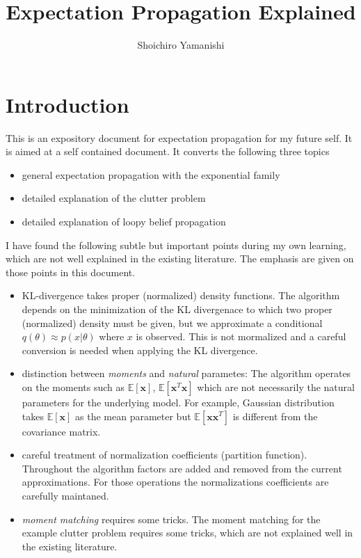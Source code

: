 \documentclass[a4]{article}
\title{Expectation Propagation Explained}
\author{Shoichiro Yamanishi}
\begin{document}
\maketitle

\section{Introduction}
This is an expository document for expectation propagation for my future self.
It is aimed at a self contained document.
It converts the following three topics
\begin{itemize}
\item general expectation propagation with the exponential family
\item detailed explanation of the clutter problem
\item detailed explanation of loopy belief propagation
\end{itemize}

I have found the following subtle but important points during my own learning, which are not well explained
in the existing literature. The emphasis are given on those points in this document.

\begin{itemize}
\item KL-divergence takes proper (normalized) density functions.
The algorithm depends on the minimization of the KL divergenace to which two proper (normalized) density
must be given, but we approximate a conditional $q(\theta) \approx p(x|\theta)$ where $x$ is observed.
This is not mormalized and a careful conversion is needed when applying the KL divergence.

\item distinction between \emph{moments} and \emph{natural} parametes: The algorithm operates on
the moments such as $\mathbb{E}[\bm{x}]$, $\mathbb{E}[\bm{x}^T\bm{x}]$ which are not necessarily the
natural parameters for the underlying model. For example, Gaussian distribution takes
$\mathbb{E}[\bm{x}]$ as the mean parameter but $\mathbb{E}[\bm{x}\bm{x}^T]$ is different from the covariance matrix.

\item careful treatment of normalization coefficients (partition function). Throughout the algorithm
factors are added and removed from the current approximations. For those operations the normalizations
coefficients are carefully maintaned.

\item \emph{moment matching} requires some tricks. The moment matching for the example clutter problem requires
some tricks, which are not explained well in the existing literature.

\end{itemize}
\end{document}
